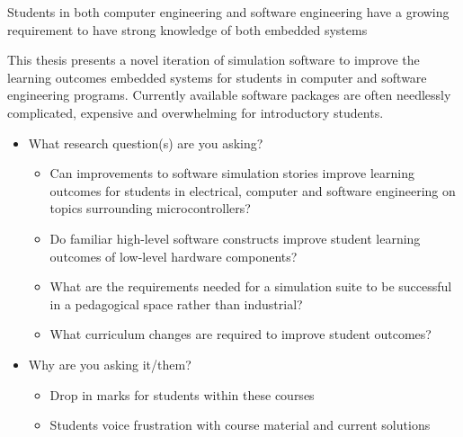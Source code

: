 Students in both computer engineering and software engineering have a growing requirement to have strong knowledge of both embedded systems


This thesis presents a novel iteration of simulation software to improve the learning outcomes embedded systems for students in computer and software engineering programs. Currently available software packages are often needlessly complicated, expensive and overwhelming for introductory students. 

\begin{itemize}

\item What research question(s) are you asking?
\begin{itemize}
\item Can improvements to software simulation stories improve learning outcomes for students in electrical, computer and software engineering on topics surrounding microcontrollers? 
\item Do familiar high-level software constructs improve student learning outcomes of low-level hardware components?
\item What are the requirements needed for a simulation suite to be successful in a pedagogical space rather than industrial?
\item What curriculum changes are required to improve student outcomes?
\end{itemize}

\item Why are you asking it/them?
\begin{itemize}
\item Drop in marks for students within these courses
\item Students voice frustration with course material and current solutions
\end{itemize}


\end{itemize}
